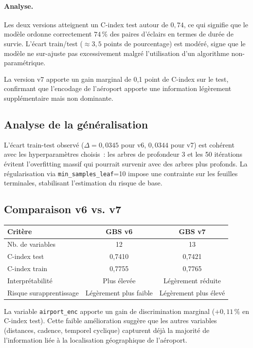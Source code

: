 \documentclass[a4paper,11pt]{article}
\begin{document}
\paragraph{Analyse.} Les deux versions atteignent un C-index test autour de $0{,}74$, ce qui
signifie que le modèle ordonne correctement $74\,\%$ des paires d'éclairs en termes de durée
de survie. L'écart train/test ($\approx 3{,}5$ points de pourcentage) est modéré, signe que le
modèle ne sur-ajuste pas excessivement malgré l'utilisation d'un algorithme non-paramétrique.

La version v7 apporte un gain marginal de 0,1 point de C-index sur le test, confirmant que
l'encodage de l'aéroport apporte une information légèrement supplémentaire mais non dominante.

\subsection{Analyse de la généralisation}

L'écart train-test observé ($\Delta = 0{,}0345$ pour v6, $0{,}0344$ pour v7) est cohérent avec
les hyperparamètres choisis~: les arbres de profondeur 3 et les 50 itérations évitent l'overfitting
massif qui pourrait survenir avec des arbres plus profonds. La régularisation via
\texttt{min\_samples\_leaf}=10 impose une contrainte sur les feuilles terminales, stabilisant
l'estimation du risque de base.

\subsection{Comparaison v6 vs. v7}

\begin{center}
\begin{tabular}{p{4cm}cc}
\toprule
\textbf{Critère} & \textbf{GBS v6} & \textbf{GBS v7} \\
\midrule
Nb. de variables & 12 & 13 \\
C-index test & 0,7410 & 0,7421 \\
C-index train & 0,7755 & 0,7765 \\
Interprétabilité & Plus élevée & Légèrement réduite \\
Risque surapprentissage & Légèrement plus faible & Légèrement plus élevé \\
\bottomrule
\end{tabular}
\end{center}

La variable \texttt{airport\_enc} apporte un gain de discrimination marginal ($+0{,}11\,\%$ en
C-index test). Cette faible amélioration suggère que les autres variables (distances, cadence,
temporel cyclique) capturent déjà la majorité de l'information liée à la localisation géographique
de l'aéroport.
\end{document}
